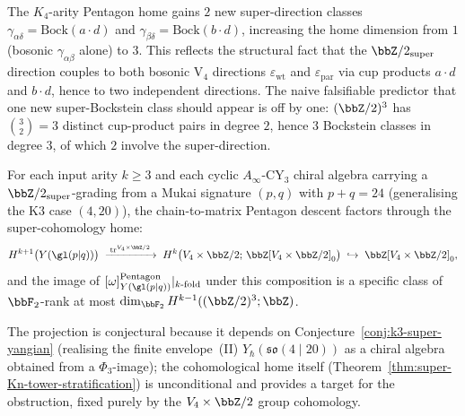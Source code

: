 \begin{remark}
\label{rem:K4-super-pentagon-two-classes}
The $K_4$-arity Pentagon home gains $2$ new super-direction classes
$\gamma_{\alpha\delta} = \mathrm{Bock}(a \cdot d)$ and
$\gamma_{\beta\delta} = \mathrm{Bock}(b \cdot d)$, increasing the home
dimension from $1$ \textup{(}bosonic $\gamma_{\alpha\beta}$ alone\textup{)}
to $3$. This reflects the structural fact that the
$\bbZ/2_{\mathrm{super}}$ direction couples to both bosonic V$_4$
directions $\varepsilon_{\mathrm{wt}}$ and $\varepsilon_{\mathrm{par}}$
via cup products $a \cdot d$ and $b \cdot d$, hence to two independent
directions. The naive falsifiable predictor that one new
super-Bockstein class should appear is off by one: $(\bbZ/2)^3$ has
$\binom{3}{2} = 3$ distinct cup-product pairs in degree $2$, hence
$3$ Bockstein classes in degree $3$, of which $2$ involve the
super-direction.
\end{remark}

\begin{conjecture}
\label{conj:super-Kn-pentagon-projection}
\ClaimStatusConjectured
For each input arity $k \geq 3$ and each cyclic
$A_\infty$-CY$_3$ chiral algebra carrying a
$\bbZ/2_{\mathrm{super}}$-grading from a Mukai signature
$(p, q)$ with $p + q = 24$ \textup{(}generalising the K$3$
case $(4, 20)$\textup{),} the chain-to-matrix Pentagon descent factors
through the super-cohomology home:
\[
 H^{k+1}\bigl(Y(\gl(p|q))\bigr)
 \;\xrightarrow{\;\mathrm{tr}^{V_4 \times \bbZ/2}\;}\;
 H^k\bigl(V_4 \times \bbZ/2;\, \bbZ[V_4 \times \bbZ/2]_0\bigr)
 \;\hookrightarrow\;
 \bbZ[V_4 \times \bbZ/2]_0,
\]
and the image of
$[\omega]^{\mathrm{Pentagon}}_{Y(\gl(p|q))}|_{k\text{-fold}}$
under this composition is a specific class of $\bbF_2$-rank at most
$\dim_{\bbF_2} H^{k-1}((\bbZ/2)^3; \bbZ)$.

The projection is conjectural because it depends on
Conjecture~\ref{conj:k3-super-yangian} \textup{(}realising the finite
envelope~(II) $Y_\hbar(\mathfrak{so}(4 \mid 20))$ as a chiral algebra
obtained from a $\Phi_3$-image\textup{);} the cohomological home itself
\textup{(}Theorem~\ref{thm:super-Kn-tower-stratification}\textup{)} is
unconditional and provides a target for the obstruction, fixed purely
by the $V_4 \times \bbZ/2$ group cohomology.
\end{conjecture}

